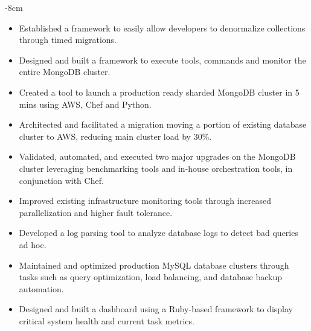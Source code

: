 \documentclass[10pt,a4paper,academicons]{altacv}
\begin{document}

\begin{adjustwidth}{}{-8cm}
\makecvheader
\end{adjustwidth}


\begin{itemize}
\item Established a framework to easily allow developers to denormalize collections through timed migrations.
\item Designed and built a framework to execute tools, commands and monitor the entire MongoDB cluster.
\item Created a tool to launch a production ready sharded MongoDB cluster in 5 mins using AWS, Chef and Python.
\item Architected and facilitated a migration moving a portion of existing
    database cluster to AWS, reducing main cluster load by 30\%.   
\item Validated, automated, and executed two major upgrades on the MongoDB
    cluster leveraging benchmarking tools and in-house orchestration tools, in
        conjunction with Chef.
\item Improved existing infrastructure monitoring tools through increased parallelization and higher fault tolerance.
\item Developed a log parsing tool to analyze database logs to detect bad queries ad hoc.
\end{itemize}

\divider

\begin{itemize}
\item Maintained and optimized production MySQL database clusters through tasks such as query optimization, load balancing, and database backup automation.
\item Designed and built a dashboard using a Ruby-based framework to display critical system health and current task metrics.
\end{itemize}

\divider
\end{document}
